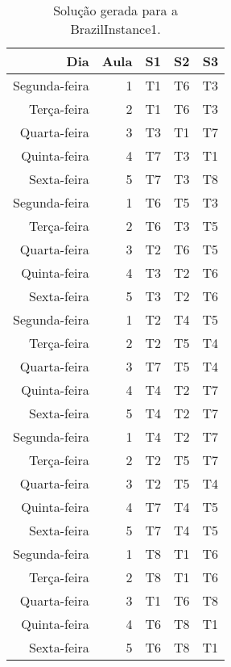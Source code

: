 \begin{table}[!htb]
    \centering
    \caption[Solução gerada para a BrazilInstance1]{Solução gerada para a BrazilInstance1.
    \label{tab:brazilinstance1_solucao}}
    \begin{tabular}{rrrrr}
        \toprule
           Dia & Aula & S1 & S2 & S3 \\
        \midrule
            Segunda-feira & 1 & T1 & T6 & T3 \\
            Terça-feira & 2 & T1 & T6 & T3 \\
            Quarta-feira & 3 & T3 & T1 & T7 \\
            Quinta-feira & 4 & T7 & T3 & T1 \\
            Sexta-feira & 5 & T7 & T3 & T8 \\
        \midrule
            Segunda-feira & 1 & T6 & T5 & T3 \\
            Terça-feira & 2 & T6 & T3 & T5 \\
            Quarta-feira & 3 & T2 & T6 & T5 \\
            Quinta-feira & 4 & T3 & T2 & T6 \\
            Sexta-feira & 5 & T3 & T2 & T6 \\
        \midrule
            Segunda-feira & 1 & T2 & T4 & T5 \\
            Terça-feira & 2 & T2 & T5 & T4 \\
            Quarta-feira & 3 & T7 & T5 & T4 \\
            Quinta-feira & 4 & T4 & T2 & T7 \\
            Sexta-feira & 5 & T4 & T2 & T7 \\
        \midrule
            Segunda-feira & 1 & T4 & T2 & T7 \\
            Terça-feira & 2 & T2 & T5 & T7 \\
            Quarta-feira & 3 & T2 & T5 & T4 \\
            Quinta-feira & 4 & T7 & T4 & T5 \\
            Sexta-feira & 5 & T7 & T4 & T5 \\
        \midrule
            Segunda-feira & 1 & T8 & T1 & T6 \\
            Terça-feira & 2 & T8 & T1 & T6 \\
            Quarta-feira & 3 & T1 & T6 & T8 \\
            Quinta-feira & 4 & T6 & T8 & T1 \\
            Sexta-feira & 5 & T6 & T8 & T1 \\
        \bottomrule
    \end{tabular}
\end{table}
